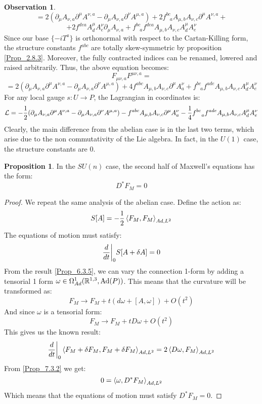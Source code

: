 \documentclass[12pt,a4paper]{report}
\theoremstyle{definition}
\theoremstyle{Theorem}
\newtheorem{Prop}[Def]{Proposition}
\theoremstyle{definition}
\theoremstyle{definition}
\newtheorem{Obs}[Def]{Observation}
\begin{document}
\begin{Obs}
		$$=2(\partial_\mu A_{\nu,a}\partial^\mu A^{\nu,a}-\partial_\mu A_{\nu,a}\partial^\nu A^{\mu,a})+2f^{bc}_{\hspace{9pt}a}A_{\mu,b}A_{\nu,c}\partial^\mu A^{\nu,a}+$$
		$$+2f^{dea}A^{\mu}_dA^{\nu}_e\partial_\mu A_{\nu,a}+f^{bc}_{\hspace{9pt}a}f^{dea}A_{\mu,b}A_{\nu,c}A^{\mu}_dA^{\nu}_e$$
		Since our base $\{-iT^a\}$ is orthonormal with respect to the Cartan-Killing form, the structure constants $f^{abc}$ are totally skew-symmetric by proposition \ref{Prop_2.8.3}. Moreover, the fully contracted indices can be renamed, lowered and raised arbitrarily. Thus, the above equation becomes:
		$$F_{\mu\nu,a}F^{\mu\nu,a}=$$
		$$=2(\partial_\mu A_{\nu,a}\partial^\mu A^{\nu,a}-\partial_\mu A_{\nu,a}\partial^\nu A^{\mu,a})+4f^{abc}A_{\mu,b}A_{\nu,c}\partial^\mu A^{\nu}_{a}+ f^{bc}_{\hspace{9pt}a}f^{ade}A_{\mu,b}A_{\nu,c}A^{\mu}_dA^{\nu}_e$$
		For any local gauge $s:U\rightarrow P$, the Lagrangian in coordinates is:
		$$\mathcal{L}=-{1\over 2}(\partial_\mu A_{\nu,a}\partial^\mu A^{\nu,a}-\partial_\mu A_{\nu,a}\partial^\nu A^{\mu,a})-f^{abc}A_{\mu,b}A_{\nu,c}\partial^\mu A^{\nu}_{a}-{1\over 4} f^{bc}_{\hspace{9pt}a}f^{ade}A_{\mu,b}A_{\nu,c}A^{\mu}_dA^{\nu}_e$$
		Clearly, the main difference from the abelian case is in the last two terms, which arise due to the non commutativity of the Lie algebra. In fact, in the $U(1)$ case, the structure constants are 0.
	\end{Obs}
	\begin{Prop}
		In the $SU(n)$ case, the second half of Maxwell's equations has the form:
		$$D^*F_M=0$$
	\end{Prop}
	\begin{proof}
		We repeat the same analysis of the abelian case. Define the action as:
		$$S[A]=-{1\over 2}\braket{F_M,F_M}_{Ad,L^2}$$
		The equations of motion must satisfy:
		$${d\over dt}\bigg|_0S[A+\delta A]=0$$
		From the result \ref{Prop_6.3.5}, we can vary the connection 1-form by adding a tensorial 1 form $\omega\in\Omega^1_{Ad}(\mathbb{R}^{1,3},\hbox{Ad}(P))$. This means that the curvature will be transformed as:
		$$F_M\rightarrow F_M+t(d\omega+[A,\omega])+O(t^2)$$
		And since $\omega$ is a tensorial form:
		$$F_M\rightarrow F_M+tD\omega+O(t^2)$$
		This gives us the known result:
		$${d\over dt}\bigg|_0\braket{F_M+\delta F_M,F_M+\delta F_M}_{Ad,L^2}=2\braket{D\omega,F_M}_{Ad,L^2}$$
		From \ref{Prop_7.3.2} we get:
		$$0=\braket{\omega,D^*F_M}_{Ad,L^2}$$
		Which means that the equations of motion must satisfy $D^*F_M=0$.
	\end{proof}
\end{document}
